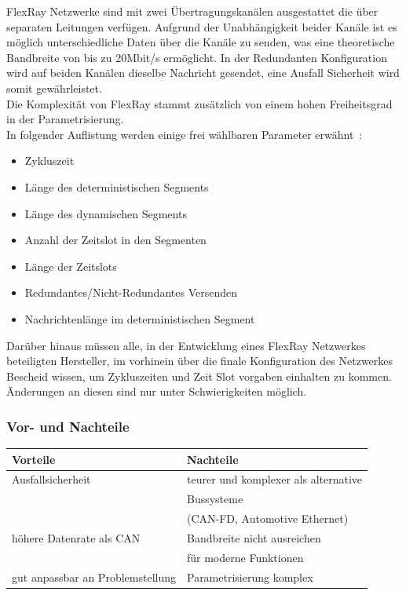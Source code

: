     FlexRay Netzwerke sind mit zwei Übertragungskanälen ausgestattet die über separaten Leitungen 
    verfügen. Aufgrund der Unabhängigkeit beider Kanäle ist es möglich unterschiedliche Daten über
    die Kanäle zu senden, was eine theoretische Bandbreite von bis zu 20Mbit/s ermöglicht. 
    In der Redundanten Konfiguration wird auf beiden Kanälen dieselbe Nachricht gesendet, eine 
    Ausfall Sicherheit wird somit gewährleistet.~\cite{LA_FR3}\\
    
    Die Komplexität von FlexRay stammt zusätzlich von einem hohen Freiheitsgrad in der
    Parametrisierung.\\
    In folgender Auflistung werden einige frei wählbaren Parameter erwähnt~\cite{LA_FR2}:
    \begin{itemize}
    \item Zykluszeit
    \item Länge des deterministischen Segments
    \item Länge des dynamischen Segments
    \item Anzahl der Zeitslot in den Segmenten
    \item Länge der Zeitslots
    \item Redundantes/Nicht-Redundantes Versenden
    \item Nachrichtenlänge im deterministischen Segment
    \end{itemize}

    Darüber hinaus müssen alle, in der Entwicklung eines FlexRay Netzwerkes beteiligten Hersteller, im 
    vorhinein über die finale Konfiguration des Netzwerkes Bescheid wissen, um Zykluszeiten und 
    Zeit Slot vorgaben einhalten zu kommen. Änderungen an diesen sind nur unter Schwierigkeiten möglich.


    \subsubsection{Vor- und Nachteile}
    \begin{center}
        \begin{tabular}{l|l}
            \textbf{Vorteile} & \textbf{Nachteile}\\
            \hline Ausfallsicherheit & teurer und komplexer als alternative\\& Bussysteme \\&(CAN-FD, Automotive Ethernet)\\
            \hline höhere Datenrate als CAN & Bandbreite nicht ausreichen\\& für moderne Funktionen\\
            \hline gut anpassbar an Problemstellung & Parametrisierung komplex\\
            \hline
        \end{tabular}            
    \end{center}

